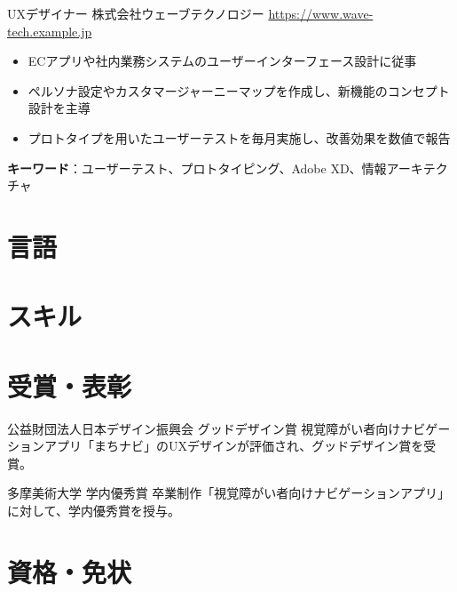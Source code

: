 \documentclass[a4paper, serif, 10pt]{moderncv}
\begin{document}
        {UXデザイナー}
        {株式会社ウェーブテクノロジー}
        {\url{https://www.wave-tech.example.jp}}
        {}
        {\begin{itemize}
\item ECアプリや社内業務システムのユーザーインターフェース設計に従事
\item ペルソナ設定やカスタマージャーニーマップを作成し、新機能のコンセプト設計を主導
\item プロトタイプを用いたユーザーテストを毎月実施し、改善効果を数値で報告
\end{itemize}
\textbf{キーワード}：ユーザーテスト、プロトタイピング、Adobe XD、情報アーキテクチャ}
\section{言語}

\section{スキル}

\section{受賞・表彰}

        {公益財団法人日本デザイン振興会}
        {グッドデザイン賞}
        {}
        {}
        {視覚障がい者向けナビゲーションアプリ「まちナビ」のUXデザインが評価され、グッドデザイン賞を受賞。}

        {多摩美術大学}
        {学内優秀賞}
        {}
        {}
        {卒業制作「視覚障がい者向けナビゲーションアプリ」に対して、学内優秀賞を授与。}
\section{資格・免状}
\end{document}
